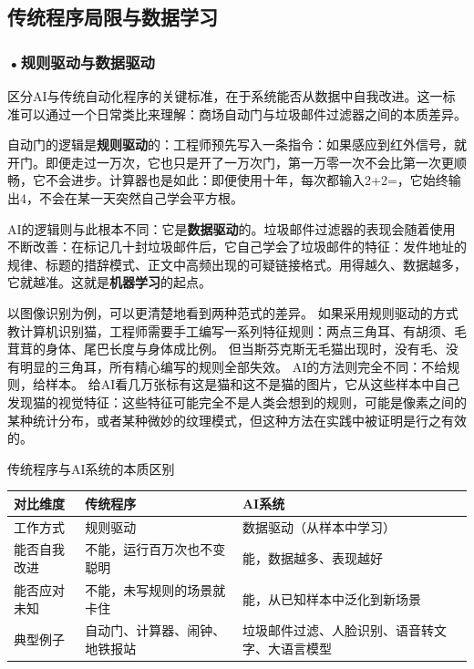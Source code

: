 \subsection{传统程序局限与数据学习}

\subsubsection*{\textbf{•规则驱动与数据驱动}}

区分AI与传统自动化程序的关键标准，在于系统能否从数据中自我改进。这一标准可以通过一个日常类比来理解：商场自动门与垃圾邮件过滤器之间的本质差异。

自动门的逻辑是\textbf{规则驱动}的：工程师预先写入一条指令：如果感应到红外信号，就开门。即便走过一万次，它也只是开了一万次门，第一万零一次不会比第一次更顺畅，它不会进步。计算器也是如此：即便使用十年，每次都输入2+2=，它始终输出4，不会在某一天突然自己学会平方根。

AI的逻辑则与此根本不同：它是\textbf{数据驱动}的。垃圾邮件过滤器的表现会随着使用不断改善：在标记几十封垃圾邮件后，它自己学会了垃圾邮件的特征：发件地址的规律、标题的措辞模式、正文中高频出现的可疑链接格式。用得越久、数据越多，它就越准。这就是\textbf{机器学习}的起点。

以图像识别为例，可以更清楚地看到两种范式的差异。
如果采用规则驱动的方式教计算机识别猫，工程师需要手工编写一系列特征规则：两点三角耳、有胡须、毛茸茸的身体、尾巴长度与身体成比例。
但当斯芬克斯无毛猫出现时，没有毛、没有明显的三角耳，所有精心编写的规则全部失效。
AI的方法则完全不同：不给规则，给样本。
给AI看几万张标有这是猫和这不是猫的图片，它从这些样本中自己发现猫的视觉特征：这些特征可能完全不是人类会想到的规则，可能是像素之间的某种统计分布，或者某种微妙的纹理模式，但这种方法在实践中被证明是行之有效的。

\begin{formalTable}
\caption{传统程序与AI系统的本质区别}
\label{tab:ch1_01}
\begin{tabularx}{\textwidth}{@{}l Y Y@{}}
\toprule
\textbf{对比维度} & \textbf{传统程序} & \textbf{AI系统} \\
\midrule
工作方式 & 规则驱动 & 数据驱动（从样本中学习） \\
能否自我改进 & 不能，运行百万次也不变聪明 & 能，数据越多、表现越好 \\
能否应对未知 & 不能，未写规则的场景就卡住 & 能，从已知样本中泛化到新场景 \\
典型例子 & 自动门、计算器、闹钟、地铁报站 & 垃圾邮件过滤、人脸识别、语音转文字、大语言模型 \\
\bottomrule
\end{tabularx}
\end{formalTable}

